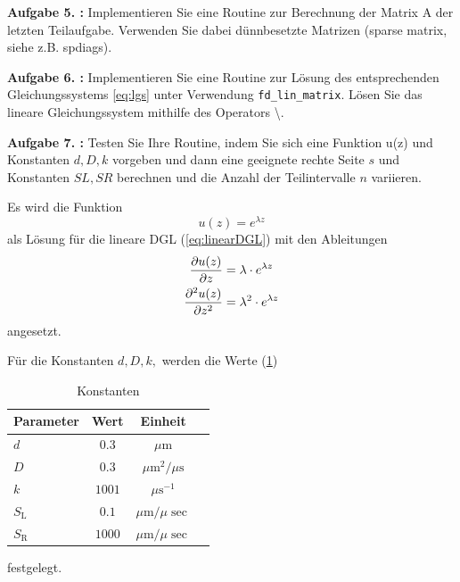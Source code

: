 \begin{mybox}
	\textbf{Aufgabe 5. :} Implementieren Sie eine Routine zur Berechnung
	der Matrix A der letzten Teilaufgabe. Verwenden
	Sie dabei dünnbesetzte Matrizen (sparse matrix, siehe z.B. spdiags).
\end{mybox}



\begin{mybox}
	\textbf{Aufgabe 6. :}
	Implementieren Sie eine Routine zur Lösung des entsprechenden
	Gleichungssystems \cref{eq:lgs} unter Verwendung
	\verb*|fd_lin_matrix|. Lösen Sie das lineare Gleichungssystem mithilfe des
	Operators \textbackslash .
\end{mybox}



\begin{mybox}
	\textbf{Aufgabe 7. :} Testen Sie Ihre Routine, indem Sie sich eine
	Funktion u(z) und Konstanten $d, D, k$ vorgeben und
	dann eine geeignete rechte Seite $s$ und Konstanten $SL, SR$ berechnen
	und die Anzahl der Teilintervalle
	$n$ variieren.
\end{mybox}
Es wird die Funktion
\begin{equation}
	u(z)=e^{\lambda z}
\end{equation}
als Lösung für die lineare DGL (\cref{eq:linearDGL}) mit den Ableitungen
\begin{align}\label{eq:fundamental_ableitung}
	\pdv{u(z)}{z}    & =\lambda \cdot e^{\lambda z}   \\
	\pdv[2]{u(z)}{z} & =\lambda^2 \cdot e^{\lambda z}
\end{align}
angesetzt.

Für die Konstanten  $d, D, k,$ werden die Werte (\cref{t:const})
\begin{table}
	\centering
	\caption{Konstanten}
	\label{t:const}
	\begin{tabular}{lccc}
		\toprule

		Parameter      & Wert   & Einheit                        \\
		\midrule
		$d$            & $0.3$  & $\si{\mu\meter}$               \\

		$D$            & $0.3$  & $\si{\mu\square\m\per \mu \s}$ \\

		$k$            & $1001$ & $\si{\mu\second^{-1}}$         \\

		$S_\mathrm{L}$ & $0.1$  & $\si{\mu\m\per\mu\sec}$        \\

		$S_\mathrm{R}$ & $1000$ & $\si{\mu\m\per\mu\sec}$        \\
		\bottomrule

	\end{tabular}

\end{table}
festgelegt.

